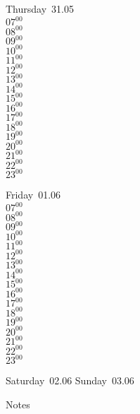 \documentclass[11pt, a4paper]{book}\usepackage[]{graphicx}\usepackage[]{color}
\begin{document}
\begin{weekdaybox}
  Thursday~31.05\\
  { 
  \vfill
  $07^{00}$\\
$08^{00}$\\
$09^{00}$\\
$10^{00}$\\
$11^{00}$\\
$12^{00}$\\
$13^{00}$\\
$14^{00}$\\
$15^{00}$\\
$16^{00}$\\
$17^{00}$\\
$18^{00}$\\
$19^{00}$\\
$20^{00}$\\
$21^{00}$\\
$22^{00}$\\
$23^{00}$\\
  }
\end{weekdaybox} 
\begin{weekdaybox}
  Friday~01.06\\
  { 
  \vfill
  $07^{00}$\\
$08^{00}$\\
$09^{00}$\\
$10^{00}$\\
$11^{00}$\\
$12^{00}$\\
$13^{00}$\\
$14^{00}$\\
$15^{00}$\\
$16^{00}$\\
$17^{00}$\\
$18^{00}$\\
$19^{00}$\\
$20^{00}$\\
$21^{00}$\\
$22^{00}$\\
$23^{00}$\\
  }
\end{weekdaybox}
\begin{weekendbox}
  Saturday~02.06
  \tcblower
  Sunday~03.06
\end{weekendbox} %
\begin{notebox}
  Notes
\end{notebox}
\clearpage
\end{document}
